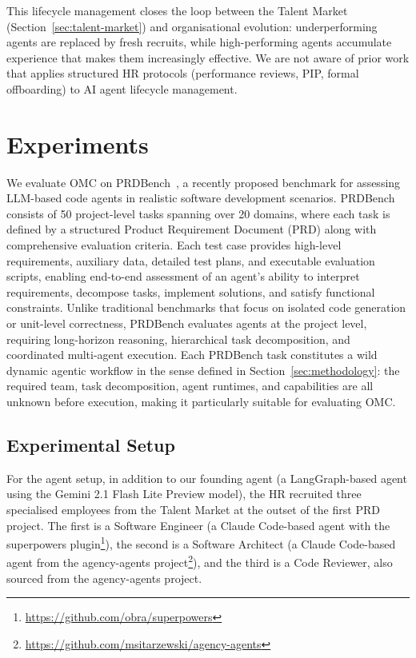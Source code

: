 \documentclass[11pt,a4paper]{article}
\begin{document}
This lifecycle management closes the loop between the Talent Market (Section~\ref{sec:talent-market}) and organisational evolution: underperforming agents are replaced by fresh recruits, while high-performing agents accumulate experience that makes them increasingly effective.  We are not aware of prior work that applies structured HR protocols (performance reviews, PIP, formal offboarding) to AI agent lifecycle management.


\section{Experiments}
\label{sec:experiments}

We evaluate OMC on PRDBench~\cite{fu2025prdbench}, a recently proposed benchmark for assessing LLM-based code agents in realistic software development scenarios.  PRDBench consists of 50 project-level tasks spanning over 20 domains, where each task is defined by a structured Product Requirement Document (PRD) along with comprehensive evaluation criteria.  Each test case provides high-level requirements, auxiliary data, detailed test plans, and executable evaluation scripts, enabling end-to-end assessment of an agent’s ability to interpret requirements, decompose tasks, implement solutions, and satisfy functional constraints.  Unlike traditional benchmarks that focus on isolated code generation or unit-level correctness, PRDBench evaluates agents at the project level, requiring long-horizon reasoning, hierarchical task decomposition, and coordinated multi-agent execution. Each PRDBench task constitutes a wild dynamic agentic workflow in the sense defined in Section~\ref{sec:methodology}: the required team, task decomposition, agent runtimes, and capabilities are all unknown before execution, making it particularly suitable for evaluating OMC.


\subsection{Experimental Setup}

For the agent setup, in addition to our founding agent (a LangGraph-based agent using the Gemini 2.1 Flash Lite Preview model), the HR recruited three specialised employees from the Talent Market at the outset of the first PRD project. The first is a Software Engineer (a Claude Code-based agent with the superpowers plugin\footnote{\url{https://github.com/obra/superpowers}}), the second is a Software Architect (a Claude Code-based agent from the agency-agents project\footnote{\url{https://github.com/msitarzewski/agency-agents}}), and the third is a Code Reviewer, also sourced from the agency-agents project.
\end{document}
